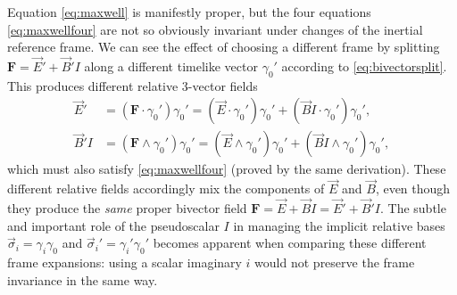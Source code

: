 \documentclass[1p,sort&compress]{elsarticle}
\numberwithin{equation}{section}
\newcommand{\rv}[1]{\vec{#1}}
\newcommand{\bv}[1]{\mathbf{#1}}
\begin{document}
Equation \eqref{eq:maxwell} is manifestly proper, but the four equations \eqref{eq:maxwellfour} are not so obviously invariant under changes of the inertial reference frame.  We can see the effect of choosing a different frame by splitting $\bv{F} = \rv{E}' + \rv{B}'I$ along a different timelike vector $\gamma_0'$ according to \eqref{eq:bivectorsplit}.  This produces different relative 3-vector fields 
\begin{align}\label{eq:passivelorentzboost}
  \rv{E}' &= (\bv{F}\cdot\gamma_0')\gamma_0' = (\rv{E}\cdot\gamma_0')\gamma_0' + (\rv{B}I\cdot\gamma_0')\gamma_0', \\
  \rv{B}'I &= (\bv{F}\wedge\gamma_0')\gamma_0' = (\rv{E}\wedge\gamma_0')\gamma_0' + (\rv{B}I\wedge\gamma_0')\gamma_0', \nonumber
\end{align}
which must also satisfy \eqref{eq:maxwellfour} (proved by the same derivation).  These different relative fields accordingly mix the components of $\rv{E}$ and $\rv{B}$, even though they produce the \emph{same} proper bivector field $\bv{F} = \rv{E} + \rv{B}I = \rv{E}' + \rv{B}'I$.  The subtle and important role of the pseudoscalar $I$ in managing the implicit relative bases $\rv{\sigma}_i = \gamma_i\gamma_0$ and $\rv{\sigma}_i' = \gamma_i'\gamma_0'$ becomes apparent when comparing these different frame expansions: using a scalar imaginary $i$ would not preserve the frame invariance in the same way.
\end{document}
